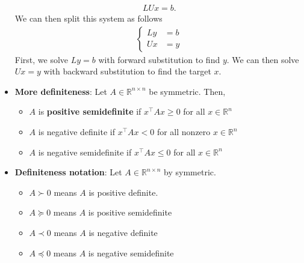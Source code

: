 \documentclass{report}
\begin{document}
\begin{itemize}
            \begin{align*}
                LUx = b
            .\end{align*}
            We can then split this system as follows
            \begin{align*}
                \begin{cases}
                    Ly &= b \\
                    Ux &= y
                \end{cases}
            \end{align*}
            First, we solve $Ly = b$ with forward substitution to find $y$. We can then solve $Ux = y$ with backward substitution to find the target $x$.
        \item \textbf{More definiteness}: Let $A \in \mathbb{R}^{n\times n}$ be symmetric. Then,
            \begin{itemize}
                \item $A$ is \textbf{positive semidefinite} if $x^{\top}Ax \geq 0 $ for all $x\in \mathbb{R}^{n} $
                \item $A$ is negative definite if $x^{\top}Ax < 0 $ for all nonzero $x\in \mathbb{R}^{n}$
                \item $A$ is negative semidefinite if $x^{\top}Ax \leq 0$ for all $x\in \mathbb{R}^{n} $
            \end{itemize}
        \item \textbf{Definiteness notation}: Let $A\in \mathbb{R}^{n\times n}$ by symmetric.
            \begin{itemize}
                \item $A \succ 0$ means $A$ is positive definite.        
                \item $A \succeq 0$ means $A$ is positive semidefinite
                \item $A \prec 0$ means $A$ is negative definite
                \item $A \preceq 0$ means $A$ is negative semidefinite
            \end{itemize}


    \end{itemize}

    \pagebreak 
    \bigbreak \noindent 
\end{document}

